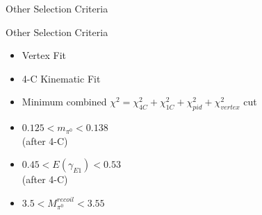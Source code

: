 \documentclass{beamer}
\begin{document}
\begin{frame}{Other Selection Criteria}
\begin{block}{Other Selection Criteria}
\begin{itemize}
\item Vertex Fit
\item 4-C Kinematic Fit
\item Minimum combined ${\chi}^2={\chi}_{4C}^2+{\chi}_{1C}^2+{\chi}_{pid}^2+{\chi}_{vertex}^2$ cut
\item $0.125<m_{\pi^0}<0.138$\\ (after 4-C)
\item $0.45<E(\gamma_{E1})<0.53$\\ (after 4-C)
\item $3.5<M^{recoil}_{\pi^0}<3.55$
\end{itemize}
\end{block}
\end{frame}
\end{document}

